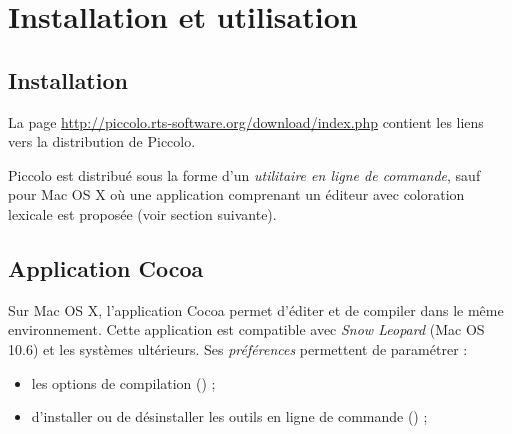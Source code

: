 

\chapter{Installation et utilisation}

\thispagestyle{empty}


\section{Installation}

La page \url{http://piccolo.rts-software.org/download/index.php} contient les liens vers la distribution de Piccolo. 

Piccolo est distribué sous la forme d'un \emph{utilitaire en ligne de commande}, sauf pour Mac OS X où une application comprenant un éditeur avec coloration lexicale est proposée (voir section suivante).





\section{Application Cocoa}

Sur Mac OS X, l'application Cocoa permet d'éditer et de compiler dans le même environnement. Cette application est compatible avec \emph{Snow Leopard} (Mac OS 10.6) et les systèmes ultérieurs. Ses \emph{préférences} permettent de paramétrer :
\begin{itemize}
\item les options de compilation () ;
\item d'installer ou de désinstaller les outils en ligne de commande () ;
\end{itemize}



